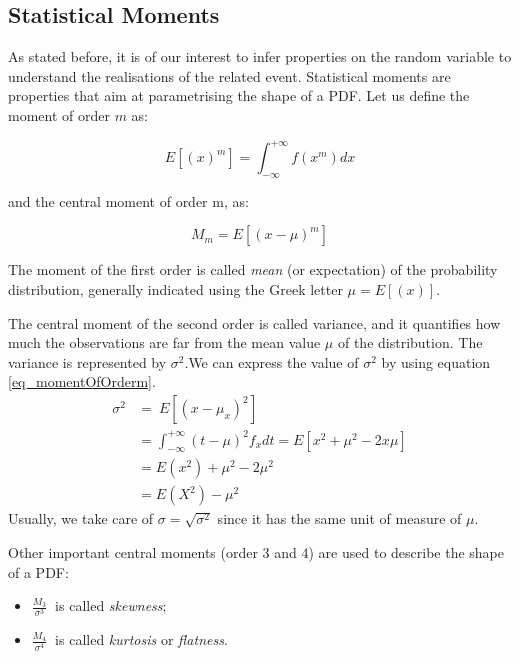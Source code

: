 \subsection{Statistical Moments}
As stated before, it is of our interest to infer properties on the random variable to understand the realisations of the related event. Statistical moments are properties that aim at parametrising the shape of a PDF. Let us define the moment of order $m$ as:

\begin{equation}
E\left[\left(x\right)^m\right]=\int_{-\infty}^{+\infty}f\left(x^m\right)dx
\label{eq_momentOfOrderm}
\end{equation}

and the central moment of order m, as:

\begin{equation}
M_m=E[\left(x-\mu\right)^m]
\label{eq_centralMomentOfOrderm}
\end{equation}

The moment of the first order is called \textit{mean} (or expectation) of the probability distribution, generally indicated using the Greek letter $\mu=E[(x)]$.\par

The central moment of the second order is called variance, and it quantifies how much the observations are far from the mean value $\mu$ of the distribution. The variance is represented by $\sigma^2$.We can express the value of $\sigma^2$  by using equation
\ref{eq_momentOfOrderm}.
\begin{equation}
    \label{eq_deploymentVariance}
    \begin{split}
    \sigma^2 & =\ E\left[\left(x-\mu_x\right)^2\right]\\
    & =\int_{-\infty}^{+\infty}\left(t-\mu\right)^2f_xdt=E\left[x^2+\mu^2-2x\mu\right]\\
    & =E\left(x^2\right)+\mu^2-2\mu^2\\
    & =E\left(X^2\right)-\mu^2
    \end{split}
\end{equation}
Usually, we take care of $\sigma=\sqrt{\sigma^2}$ since it has the same unit of measure of $\mu$.\par

Other important central moments (order 3 and 4) are used to describe the shape of a PDF:
\begin{itemize}
    \item $\frac{M_3}{\sigma^3}\ $ is called \textit{skewness};
    \item $\frac{M_4}{\sigma^4}\ $  is called \textit{kurtosis} or \textit{flatness}.
    
\end{itemize}

